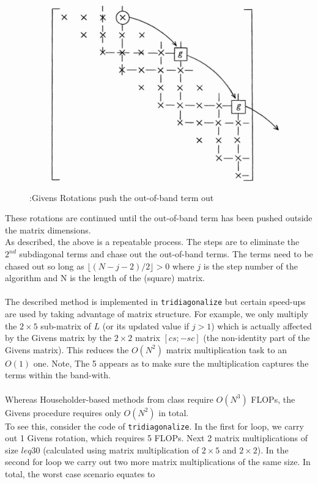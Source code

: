 \documentclass[paper=a4, fontsize=12pt]{scrartcl} %
\numberwithin{equation}{section}       %
\numberwithin{figure}{section}         %
\numberwithin{table}{section}          %
\begin{document}
\begin{center}
	\begin{figure}[h!]
	  \includegraphics[width=\linewidth]{outofband}
	  \caption{\cite{1}:Givens Rotations push the out-of-band term out}
	  \label{fig:outofband}
	\end{figure}
\end{center}


\noindent These rotations are continued until the out-of-band term has been pushed outside the matrix dimensions. \\
As described, the above is a repeatable process. The steps are to eliminate the $2^{nd}$ subdiagonal terms and chase out the out-of-band terms. The terms need to be chased out so long as $\lfloor (N - j - 2)/2 \rfloor >0$ where $j$ is the step number of the algorithm and N is the length of the (square) matrix. \\
\\
The described method is implemented in \texttt{tridiagonalize} but certain speed-ups are used by taking advantage of matrix structure. For example, we only multiply the $2\times 5$ sub-matrix of $L$ (or its updated value if $j > 1$) which is actually affected by the Givens matrix by the $2\times 2$ matrix $[c s; -s c]$ (the non-identity part of the Givens matrix). This reduces the $O(N^2)$ matrix multiplication task to an $O(1)$ one. Note, The 5 appears as to make sure the multiplication captures the terms within the band-with.\\
\\
Whereas Householder-based methods from class require $O(N^3)$ FLOPs, the Givens procedure requires only $O(N^2)$ in total. \\
\indent To see this, consider the code of \texttt{tridiagonalize}. In the first for loop, we carry out 1 Givens rotation, which requires 5 FLOPs. Next 2 matrix multiplications of size $leq 30$ (calculated using matrix multiplication of $2\times 5$ and $2\times 2$). In the second for loop we carry out two more matrix multiplications of the same size. In total, the worst case scenario equates to
\end{document}
